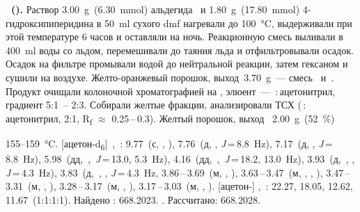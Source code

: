 \textbf{~().}
Раствор \SI{3.00}{\gram}~(\SI{6.30}{\mmol}) альдегида~ и \SI{1.80}{\gram}~(\SI{17.80}{\mmol}) 4-гидроксипиперидина в \SI{50}{\milli\litre} сухого \ac{dmf} нагревали до \SI{100}{\celsius}, выдерживали при этой температуре 6 часов и оставляли на ночь.
Реакционную смесь выливали в \SI{400}{\milli\litre} воды со льдом, перемешивали до таяния льда и отфильтровывали осадок.
Осадок на фильтре промывали водой до нейтральной реакции, затем гексаном и сушили на воздухе.
Желто-оранжевый порошок, выход~\SI{3.70}{\gram}~--- смесь~ и~.
Продукт очищали колоночной хроматографией на , элюент~--- \,:\,ацетонитрил, градиент 5:1~-- 2:3. Собирали желтые фракции, анализировали ТСХ (\,:\,ацетонитрил, 2:1, R\textsubscript{f} $\approx$ 0.25\,--\,0.3).
Желтый порошок, выход~ \SI{2.00}{\gram}~(\SI{52}{\percent})
\begin{experimental}[]
     155--\SI{159}{\celsius}.
    [ацетон­-d\textsubscript{6}]~\chemdelta{},~\si{\ppm}: 9.77~(с, , ), 7.76~(д, , \textit{J}\,=\,8.8~\si{\hertz}), 7.17~(д, , \textit{J}\,=\,8.8~\si{\hertz}), 5.98~(дд,~,~\textit{J}\,=\,13.0, 5.3~\si{\hertz}), 4.16~(дд,~,~\textit{J}\,=\,18.2, 13.0~\si{\hertz}), 3.93~(д,~, , \textit{J}\,=\,4.3~\si{\hertz}), 3.83~(д,~, , \textit{J}\,=\,4.3~\si{\hertz}, 3.86\,--\,3.69~(м, , ), 3.63\,--\,3.47~(м, , , ), 3.47\,--\,3.31~(м, , ), 3.28\,--\,3.17~(м, , ), 3.17\,--\,3.03~(м, , ).
    [ацетон-] \chemdelta,~\si{\ppm}: 22.27, 18.05, 12.62, 11.67~(1:1:1:1).
     Найдено \ce{[M+]}: \num{668.2023}. . Рассчитано:  \num{668.2028}.
\end{experimental}

